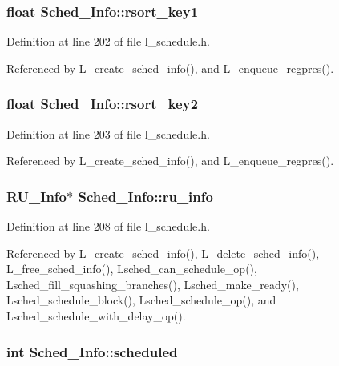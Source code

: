 \subsubsection{\setlength{\rightskip}{0pt plus 5cm}float \bf{Sched\_\-Info::rsort\_\-key1}}\label{structSched__Info_bb2769b8703fd0c911edcd93d3c91c7e}




Definition at line 202 of file l\_\-schedule.h.

Referenced by L\_\-create\_\-sched\_\-info(), and L\_\-enqueue\_\-regpres().
\subsubsection{\setlength{\rightskip}{0pt plus 5cm}float \bf{Sched\_\-Info::rsort\_\-key2}}\label{structSched__Info_a282d2f1f486240abb917cd4e6d8b64b}




Definition at line 203 of file l\_\-schedule.h.

Referenced by L\_\-create\_\-sched\_\-info(), and L\_\-enqueue\_\-regpres().
\subsubsection{\setlength{\rightskip}{0pt plus 5cm}\bf{RU\_\-Info}$\ast$ \bf{Sched\_\-Info::ru\_\-info}}\label{structSched__Info_4f68c8b780856fd98d7e5de7c93cf609}




Definition at line 208 of file l\_\-schedule.h.

Referenced by L\_\-create\_\-sched\_\-info(), L\_\-delete\_\-sched\_\-info(), L\_\-free\_\-sched\_\-info(), Lsched\_\-can\_\-schedule\_\-op(), Lsched\_\-fill\_\-squashing\_\-branches(), Lsched\_\-make\_\-ready(), Lsched\_\-schedule\_\-block(), Lsched\_\-schedule\_\-op(), and Lsched\_\-schedule\_\-with\_\-delay\_\-op().
\subsubsection{\setlength{\rightskip}{0pt plus 5cm}int \bf{Sched\_\-Info::scheduled}}\label{structSched__Info_b91ed6e88e2007b5f350d91ba4c72d70}




